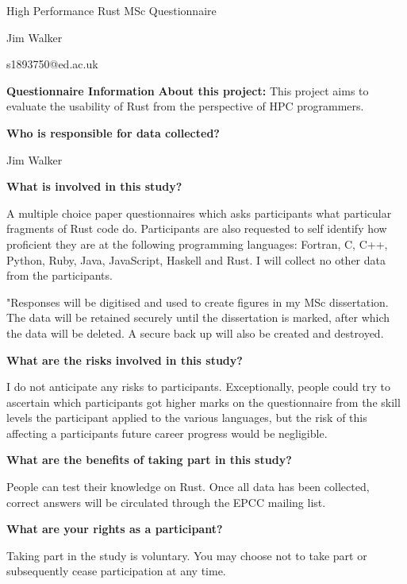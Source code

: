 \documentclass[11pt]{article} %
\begin{document}
\author{Jim Walker}
\begin{center}
\large {High Performance Rust MSc Questionnaire}

\normalsize Jim Walker

s1893750@ed.ac.uk
\end{center}
\textbf{Questionnaire Information}
\newline\newline
\noindent\textbf{About this project:}
\newline
\noindent This project aims to evaluate the usability of Rust from the perspective of HPC programmers.

\noindent\textbf{Who is responsible for data collected?}

\noindent Jim Walker

\noindent\textbf{What is involved in this study?}

\noindent A multiple choice paper questionnaires which asks participants what particular fragments of Rust code do. Participants are also requested to self identify how proficient they are at the following programming languages: Fortran, C, C++, Python, Ruby, Java, JavaScript, Haskell and Rust. I will collect no other data from the participants.

\noindent "Responses will be digitised and used to create figures in my MSc dissertation. The data will be retained securely until the dissertation is marked, after which the data will be deleted. A secure back up will also be created and destroyed.

\noindent\textbf{What are the risks involved in this study?}

\noindent I do not anticipate any risks to participants. Exceptionally, people could try to ascertain which participants got higher marks on the questionnaire from the skill levels the participant applied to the various languages, but the risk of this affecting a participants future career progress would be negligible.

\noindent\textbf{What are the benefits of taking part in this study?}

\noindent People can test their knowledge on Rust. Once all data has been collected, correct answers will be circulated through the EPCC mailing list.

\noindent\textbf{What are your rights as a participant?}

\noindent Taking part in the study is voluntary. You may choose not to take part or subsequently cease participation at any time.
\end{document}
